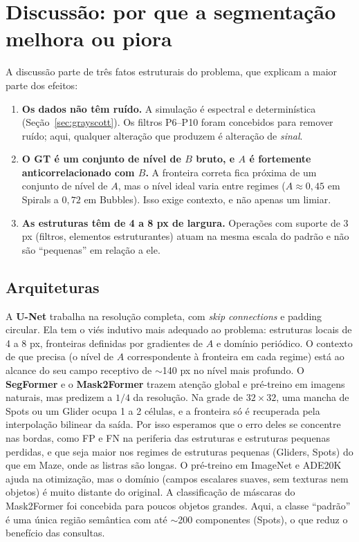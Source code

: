 \section{Discussão: por que a segmentação melhora ou piora}
\label{sec:discussao}

A discussão parte de três fatos estruturais do problema, que explicam a maior parte dos efeitos:
\begin{enumerate}
  \item \textbf{Os dados não têm ruído.} A simulação é espectral e determinística
    (Seção~\ref{sec:grayscott}). Os filtros P6--P10 foram concebidos para remover ruído; aqui,
    qualquer alteração que produzem é alteração de \emph{sinal}.
  \item \textbf{O GT é um conjunto de nível de $B$ bruto, e $A$ é fortemente anticorrelacionado com
    $B$.} A fronteira correta fica próxima de um conjunto de nível de $A$, mas o nível ideal varia
    entre regimes ($A\approx0{,}45$ em Spirals a $0{,}72$ em Bubbles). Isso exige contexto, e não
    apenas um limiar.
  \item \textbf{As estruturas têm de 4 a 8 px de largura.} Operações com suporte de 3 px (filtros,
    elementos estruturantes) atuam na mesma escala do padrão e não são ``pequenas'' em relação a ele.
\end{enumerate}

\subsection{Arquiteturas}
A \textbf{U-Net} trabalha na resolução completa, com \emph{skip connections} e padding circular.
Ela tem o viés indutivo mais adequado ao problema: estruturas locais de 4 a 8 px, fronteiras
definidas por gradientes de $A$ e domínio periódico. O contexto de que precisa (o nível de $A$
correspondente à fronteira em cada regime) está ao alcance do seu campo receptivo de $\sim$140 px
no nível mais profundo.
O \textbf{SegFormer} e o \textbf{Mask2Former} trazem atenção global e pré-treino em imagens
naturais, mas predizem a $1/4$ da resolução. Na grade de $32\times32$, uma mancha de Spots ou um
Glider ocupa 1 a 2 células, e a fronteira só é recuperada pela interpolação bilinear da saída. Por
isso esperamos que o erro deles se concentre nas bordas, como FP e FN na periferia das estruturas e
estruturas pequenas perdidas, e que seja maior nos regimes de estruturas pequenas (Gliders, Spots)
do que em Maze, onde as listras são longas. O pré-treino em ImageNet e ADE20K ajuda na otimização,
mas o domínio (campos escalares suaves, sem texturas nem objetos) é muito distante do original.
A classificação de máscaras do Mask2Former foi concebida para poucos objetos grandes. Aqui, a classe
``padrão'' é uma única região semântica com até $\sim$200 componentes (Spots), o que reduz o
benefício das consultas. 

